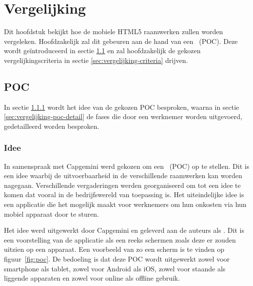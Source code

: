 \chapter{Vergelijking}
\label{chap:vergelijking}

Dit hoofdstuk bekijkt hoe de mobiele HTML5 raamwerken zullen worden vergeleken.
Hoofdzakelijk zal dit gebeuren aan de hand van een ~(POC).
Deze wordt geïntroduceerd in sectie \ref{sec:vergelijking-poc} en zal hoofdzakelijk de gekozen vergelijkingscriteria in sectie \ref{sec:vergelijking-criteria} drijven.


\section{POC}
\label{sec:vergelijking-poc}
In sectie \ref{sec:vergelijking-poc-idee} wordt het idee van de gekozen POC besproken, waarna in sectie \ref{sec:vergelijking-poc-detail} de fases die door een werknemer worden uitgevoerd, gedetailleerd worden besproken.

\subsection{Idee}
\label{sec:vergelijking-poc-idee}

In samenspraak met Capgemini werd gekozen om een ~(POC) op te stellen.
Dit is een idee waarbij de uitvoerbaarheid in de verschillende raamwerken kan worden nagegaan.
Verschillende vergaderingen werden georganiseerd om tot een idee te komen dat vooral in de bedrijfswereld van toepassing is.
Het uiteindelijke idee is een applicatie die het mogelijk maakt voor werknemers om hun onkosten via hun mobiel apparaat door te sturen.

Het idee werd uitgewerkt door Capgemini en geleverd aan de auteurs als .
Dit is een voorstelling van de applicatie als een reeks schermen zoals deze er zouden uitzien op een apparaat. 
Een voorbeeld van zo een scherm is te vinden op figuur~\ref{fig:poc}. 
De bedoeling is dat deze POC wordt uitgewerkt zowel voor smartphone als tablet, zowel voor Android als iOS, zowel voor staande als liggende apparaten en zowel voor online als offline gebruik.

